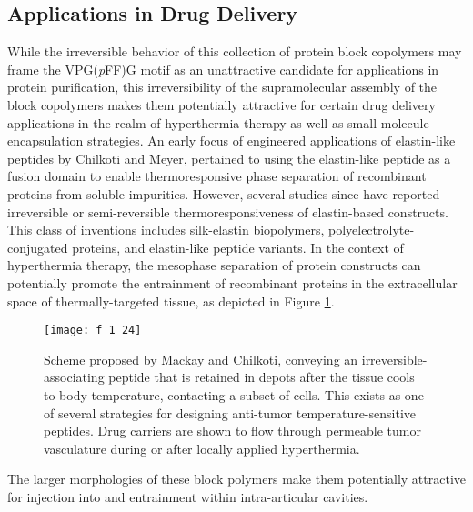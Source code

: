 \begin{refsection}
\subsection{Applications in Drug Delivery}

While the irreversible behavior of this collection of protein block copolymers
may frame the VPG(\emph{p}FF)G motif as an unattractive candidate for
applications in protein purification, this irreversibility of the supramolecular
assembly of the block copolymers makes them potentially attractive for certain drug delivery
applications in the realm of hyperthermia therapy as well as small molecule
encapsulation strategies. An early focus of engineered applications of 
elastin-like peptides by Chilkoti and Meyer, pertained to 
using the elastin-like peptide as a fusion domain to enable thermoresponsive
phase separation of recombinant proteins from soluble
impurities.\cite{Meyer1999,Meyer2001} However, several studies since have reported
irreversible or semi-reversible thermoresponsiveness of elastin-based
constructs. This class of inventions includes silk-elastin biopolymers,
polyelectrolyte-conjugated proteins, and elastin-like peptide
variants.\cite{Herrero-Vanrell2005,Megeed2002,Kayitmazer2007} In the context of
hyperthermia therapy, the mesophase separation of protein constructs can
potentially promote the entrainment of recombinant proteins in the extracellular
space of thermally-targeted tissue, as depicted in Figure
\ref{fig:irreversible_delivery}.
\begin{figure}[h!] \centering \texttt{[image: f\_1\_24]}
    \caption[Scheme proposed by Mackay and Chilkoti, conveying an
        irreversible-associating peptide that is retained in depots after the
        tissue cools to body temperature, contacting a subset of cells. This
        exists as one of several strategies for designing anti-tumor
        temperature-sensitive peptides. Drug carriers are shown to flow through
    permeable tumor vasculature during or after locally applied
hyperthermia.]{Scheme proposed by Mackay and Chilkoti,\cite{Mackay2008}
conveying an irreversible-associating peptide that is retained in depots after
the tissue cools to body temperature, contacting a subset of cells. This exists
as one of several strategies for designing anti-tumor temperature-sensitive
peptides. Drug carriers are shown to flow through permeable tumor vasculature
during or after locally applied hyperthermia.} \label{fig:irreversible_delivery} \end{figure}
The larger morphologies of these block polymers make them potentially attractive
for injection into and entrainment within intra-articular cavities.\cite{Nettles2008,Betre2006a} 


\end{refsection}
